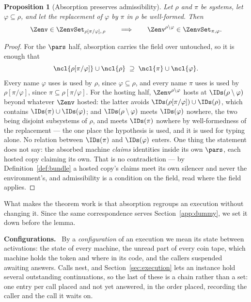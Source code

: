 \documentclass[10pt,oneside,openany]{book}
\newcommand{\heading}[1]{\medskip\par\noindent\textcolor{accent}{\textbf{#1.}}\ }
\theoremstyle{accentdef}
\theoremstyle{accentplain}
\newtheorem{proposition}[definition]{Proposition}
\begin{document}
\begin{proposition}[Absorption preserves admissibility]\label{prop:absorb}
Let $\rho$ and $\pi$ be systems, let $\varphi \subseteq \rho$, and let the replacement of
$\varphi$ by $\pi$ in $\rho$ be well-formed. Then
\[
  \Zenv \in \ZenvSet_{\rho[\pi/\varphi],\,\rho}
  \qquad\Longrightarrow\qquad
  \Zenv^{\rho \setminus \varphi} \in \ZenvSet_{\pi,\varphi} .
\]
\end{proposition}

\begin{proof}
For the $\pars$ half, absorption carries the field over untouched, so it
is enough that
\[
  \ncl{\rho[\pi/\varphi]} \cup \ncl{\rho} \;\supseteq\; \ncl{\pi} \cup \ncl{\varphi} .
\]
Every name $\varphi$ uses is used by $\rho$, since $\varphi \subseteq \rho$, and every name $\pi$
uses is used by $\rho[\pi/\varphi]$, since $\pi \subseteq \rho[\pi/\varphi]$. For the hosting
half, $\Zenv^{\rho \setminus \varphi}$ hosts at $\IDs(\rho \setminus \varphi)$ beyond whatever
$\Zenv$ hosted: the latter avoids $\IDs(\rho[\pi/\varphi]) \cup \IDs(\rho)$, which contains
$\IDs(\pi) \cup \IDs(\varphi)$; and $\IDs(\rho \setminus \varphi)$ meets $\IDs(\varphi)$ nowhere,
the two being disjoint subsystems of $\rho$, and meets $\IDs(\pi)$ nowhere by well-formedness of
the replacement --- the one place the hypothesis is used, and it is used for typing alone. No
relation between $\IDs(\pi)$ and $\IDs(\varphi)$ enters. One thing the
statement does not say: the absorbed machine \emph{claims} identities inside its own $\pars$,
each hosted copy claiming its own. That is no contradiction --- by Definition~\ref{def:bundle} a
hosted copy's claims meet its own silencer and never the environment's, and admissibility is a
condition on the field, read where the field applies.
\end{proof}

What makes the theorem work is that absorption regroups an execution without changing it. Since the
same correspondence serves Section~\ref{app:dummy}, we set it down before the lemma.

\heading{Configurations} By a \emph{configuration} of an execution we mean its state between
activations: the state of every machine, the unread part of every coin tape, which machine holds
the token and where in its code, and the callers suspended awaiting answers. Calls nest, and
Section~\ref{sec:execution} lets an instance hold several outstanding continuations, so the last of
these is a chain rather than a set: one entry per call placed and not yet answered, in the order
placed, recording the caller and the call it waits on.
\end{document}
